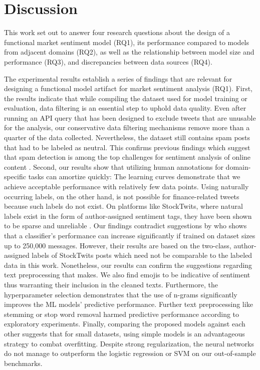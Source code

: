 \section{Discussion}

This work set out to answer four research questions about the design of a functional market sentiment model (RQ1), its performance compared to models from adjacent domains (RQ2), as well as the relationship between model size and performance (RQ3), and discrepancies between data sources (RQ4).

The experimental results establish a series of findings that are relevant for designing a functional model artifact for market sentiment analysis (RQ1). First, the results indicate that while compiling the dataset used for model training or evaluation, data filtering is an essential step to uphold data quality. Even after running an API query that has been designed to exclude tweets that are unusable for the analysis, our conservative data filtering mechanisms remove more than a quarter of the data collected. Nevertheless, the dataset still contains spam posts that had to be labeled as neutral. This confirms previous findings which suggest that spam detection is among the top challenges for sentiment analysis of online content . Second, our results show that utilizing human annotations for domain-specific tasks can amortize quickly: The learning curves demonstrate that we achieve acceptable performance with relatively few data points. Using naturally occurring labels, on the other hand, is not possible for finance-related tweets because such labels do not exist. On platforms like StockTwits, where natural labels exist in the form of author-assigned sentiment tags, they have been shown to be sparse and unreliable . Our findings contradict suggestions by  who shows that a classifier's performance can increase significantly if trained on dataset sizes up to 250,000 messages. However, their results are based on the two-class, author-assigned labels of StockTwits posts which need not be comparable to the labeled data in this work. Nonetheless, our results can confirm the suggestions regarding text preprocessing that  makes. We also find emojis to be indicative of sentiment thus warranting their inclusion in the cleaned texts. Furthermore, the hyperparameter selection demonstrates that the use of n-grams significantly improves the ML models' predictive performance. Further text preprocessing like stemming or stop word removal harmed predictive performance according to exploratory experiments. Finally, comparing the proposed models against each other suggests that for small datasets, using simple models is an advantageous strategy to combat overfitting. Despite strong regularization, the neural networks do not manage to outperform the logistic regression or SVM on our out-of-sample benchmarks.

